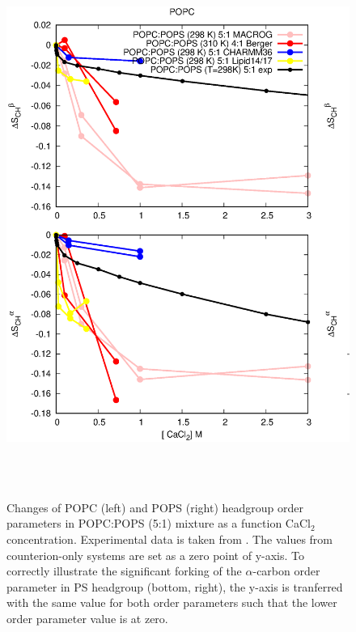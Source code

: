 \documentclass[aps,prl,superscriptaddress,twocolumn]{revtex4}
\begin{document}
\begin{figure}[]
  \centering
  \includegraphics[width=18cm]{../Figs/CHANGESwithCaClPS.eps}
  \caption{\label{changesWITHCaClPS}
    Changes of POPC (left) and POPS (right) headgroup order parameters in POPC:POPS (5:1) mixture
    as a function CaCl$_2$ concentration. Experimental data is taken from .
    The values from counterion-only systems are set as a zero point of y-axis.
    To correctly illustrate the significant forking of the $\alpha$-carbon order parameter
    in PS headgroup (bottom, right), the y-axis is tranferred with the same value for both order parameters such that the lower order
    parameter value is at zero. 
  }
   \\
   \\
\end{figure}
\end{document}

